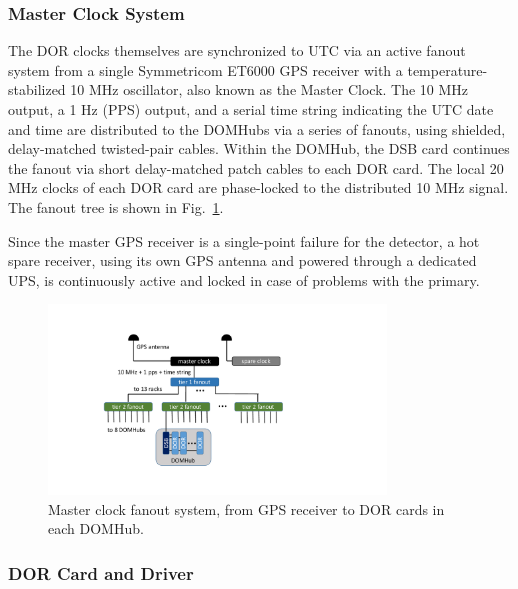

\subsubsection{\label{sect:online:master_clock}Master Clock System}

The DOR clocks themselves are synchronized to UTC via an active fanout
system from a single Symmetricom ET6000 GPS receiver with a
temperature-stabilized 10 MHz oscillator, also known as the Master Clock.
The 10 MHz output, a 1 Hz (PPS) output, and a serial time string indicating
the UTC date and time are distributed 
to the DOMHubs via a series of fanouts, using shielded, delay-matched
twisted-pair cables.  Within the DOMHub, the DSB card continues the fanout
via short delay-matched patch cables to each DOR card.  The local 20 MHz
clocks of each DOR card are phase-locked to the distributed 10 MHz signal.
The fanout tree is shown in Fig.~\ref{fig:clock_fanout}.

Since the master GPS receiver is a single-point failure for the detector, a
hot spare receiver, using its own GPS antenna and powered through a
dedicated UPS, is continuously active and locked in case of problems with
the primary.

\begin{figure}[!h]
 \centering
 \includegraphics[width=0.8\textwidth]{graphics/online/data_readout/clock_fanout.pdf}
 \caption{Master clock fanout system, from GPS receiver to DOR cards in
   each DOMHub.}
 \label{fig:clock_fanout}
\end{figure}


\subsubsection{DOR Card and Driver}

